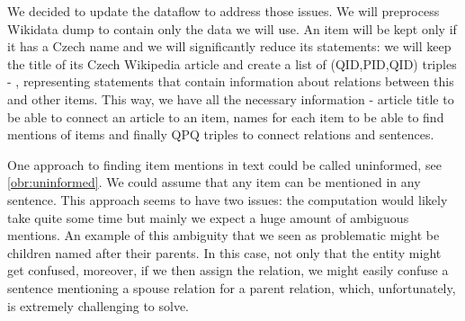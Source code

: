 \begin{figure}
\centering
{}
\qquad
{}
\label{obr:informedvsuninformed}
\end{figure}



We decided to update the dataflow to address those issues. We will preprocess Wikidata dump to contain only the data we will use. An item will be kept only if it has a Czech name and we will significantly reduce its statements: we will keep the title of its Czech Wikipedia article and create a list of (QID,PID,QID) triples - , representing statements that contain information about relations between this and other items. This way, we have all the necessary information - article title to be able to connect an article to an item, names for each item to be able to find mentions of items and finally QPQ triples to connect relations and sentences.

One approach to finding item mentions in text could be called uninformed, see \ref{obr:uninformed}. We could assume that any item can be mentioned in any sentence. This approach seems to have two issues: the computation would likely take quite some time but mainly we expect a huge amount of ambiguous mentions. An example of this ambiguity that we seen as problematic might be children named after their parents. In this case, not only that the entity might get confused, moreover, if we then assign the relation, we might easily confuse a sentence mentioning a spouse relation for a parent relation, which, unfortunately, is extremely challenging to solve. 

